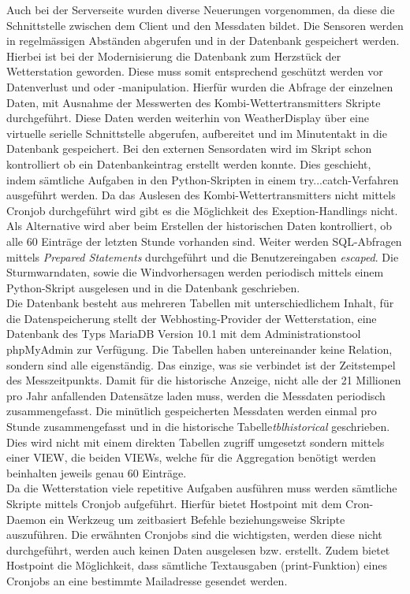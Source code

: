 \documentclass[10pt]{article}
\begin{document}
\begin{multicols}{2}
Auch bei der  Serverseite wurden diverse Neuerungen vorgenommen, da diese die Schnittstelle zwischen dem Client und den Messdaten bildet. Die Sensoren werden in regelmässigen Abständen abgerufen und in der Datenbank gespeichert werden. Hierbei ist bei der Modernisierung die Datenbank zum Herzstück der Wetterstation geworden. Diese muss somit entsprechend geschützt werden vor Datenverlust und oder -manipulation. Hierfür wurden die Abfrage der einzelnen Daten, mit Ausnahme der Messwerten des Kombi-Wettertransmitters Skripte durchgeführt. Diese Daten werden weiterhin von WeatherDisplay über eine virtuelle serielle Schnittstelle abgerufen, aufbereitet und im Minutentakt in die Datenbank gespeichert. Bei den externen Sensordaten wird im Skript schon kontrolliert ob ein Datenbankeintrag erstellt werden konnte. Dies geschieht, indem sämtliche Aufgaben in den Python-Skripten in einem try...catch-Verfahren ausgeführt werden. Da das Auslesen des Kombi-Wettertransmitters nicht mittels Cronjob durchgeführt wird gibt es die Möglichkeit des Exeption-Handlings nicht. Als Alternative wird aber beim Erstellen der historischen Daten kontrolliert, ob alle 60 Einträge der letzten Stunde vorhanden sind. Weiter werden SQL-Abfragen mittels \emph{Prepared Statements} durchgeführt und die Benutzereingaben \emph{escaped}. Die Sturmwarndaten, sowie die Windvorhersagen werden periodisch mittels einem Python-Skript ausgelesen und in die Datenbank geschrieben.\\
Die Datenbank besteht aus mehreren Tabellen mit unterschiedlichem Inhalt, für die Datenspeicherung stellt der Webhosting-Provider der Wetterstation, eine Datenbank des Typs MariaDB Version 10.1 mit dem Administrationstool phpMyAdmin zur Verfügung. Die Tabellen haben untereinander keine Relation, sondern sind alle eigenständig. Das einzige, was sie verbindet ist der Zeitstempel des Messzeitpunkts. Damit für die historische Anzeige, nicht alle der 21 Millionen pro Jahr anfallenden Datensätze laden muss, werden die Messdaten periodisch zusammengefasst. Die minütlich gespeicherten Messdaten werden einmal pro Stunde zusammengefasst und in die historische Tabelle\emph{tblhistorical} geschrieben. Dies wird nicht mit einem direkten Tabellen zugriff umgesetzt sondern mittels einer VIEW, die beiden VIEWs, welche für die Aggregation benötigt werden beinhalten jeweils genau 60 Einträge.\\
Da die Wetterstation viele repetitive Aufgaben ausführen muss werden sämtliche Skripte mittels Cronjob aufgeführt. Hierfür  bietet Hostpoint mit dem Cron-Daemon ein Werkzeug um zeitbasiert Befehle beziehungsweise Skripte auszuführen. Die erwähnten Cronjobs sind die wichtigsten, werden diese nicht durchgeführt, werden auch keinen Daten ausgelesen bzw. erstellt. Zudem bietet Hostpoint die Möglichkeit, dass sämtliche Textausgaben (print-Funktion) eines Cronjobs an eine bestimmte Mailadresse gesendet werden.\\

\end{multicols}
\end{document}
